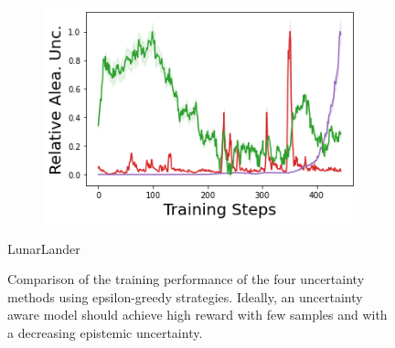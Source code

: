 \begin{figure}
\begin{subfigure}{.24\textwidth}
    \end{subfigure}
    \begin{subfigure}{.24\textwidth}
        \includegraphics[width=\textwidth]{sections/011_icml2022/resources/lunarlander-training_aleatoric_ucertainty-training-model.png}  
    \end{subfigure}
    \vspace{-3mm}
    \caption*{LunarLander}
    \vspace{2mm}

    \caption{Comparison of the training performance of the four uncertainty methods using epsilon-greedy strategies. Ideally, an uncertainty aware model should achieve high reward with few samples and with a decreasing epistemic uncertainty.}
    \label{fig:model-training-performance}
\end{figure}